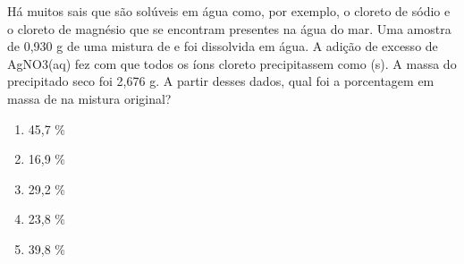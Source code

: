 Há muitos sais que são solúveis em água como, por exemplo, o cloreto de sódio e o cloreto de magnésio que se encontram presentes na água do mar. Uma amostra de 0,930 g de uma mistura de  e  foi dissolvida em água. A adição de excesso de AgNO3(aq) fez com que todos os íons cloreto precipitassem como (s). A massa do precipitado seco foi 2,676 g. A partir desses dados, qual foi a porcentagem em massa de  na mistura original?

\begin{enumerate}[label = (\alph*)]
	\item 45,7 $\%$
	\item 16,9 $\%$
	\item 29,2 $\%$
	\item 23,8 $\%$
	\item 39,8 $\%$
\end{enumerate}